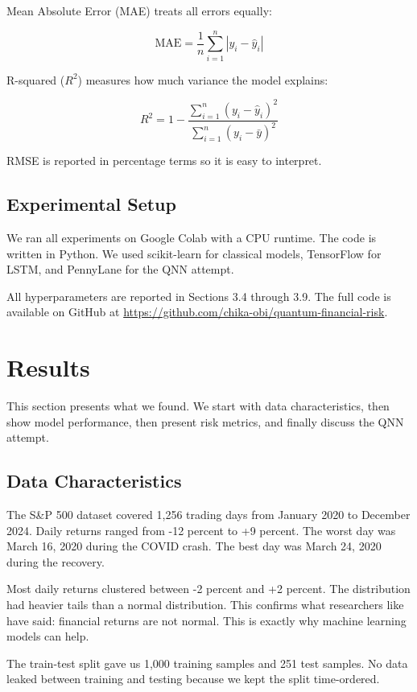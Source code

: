 \documentclass[12pt,a4paper]{article}
\begin{document}
Mean Absolute Error (MAE) treats all errors equally:

\begin{equation}
\text{MAE} = \frac{1}{n} \sum_{i=1}^{n} |y_i - \hat{y}_i|
\end{equation}

R-squared ($R^2$) measures how much variance the model explains:

\begin{equation}
R^2 = 1 - \frac{\sum_{i=1}^{n} (y_i - \hat{y}_i)^2}{\sum_{i=1}^{n} (y_i - \bar{y})^2}
\end{equation}

RMSE is reported in percentage terms so it is easy to interpret.

\subsection{Experimental Setup}
We ran all experiments on Google Colab with a CPU runtime. The code is written in Python. We used scikit-learn for classical models, TensorFlow for LSTM, and PennyLane for the QNN attempt.

All hyperparameters are reported in Sections 3.4 through 3.9. The full code is available on GitHub at \url{https://github.com/chika-obi/quantum-financial-risk}.

\section{Results}
This section presents what we found. We start with data characteristics, then show model performance, then present risk metrics, and finally discuss the QNN attempt.

\subsection{Data Characteristics}
The S\&P 500 dataset covered 1,256 trading days from January 2020 to December 2024. Daily returns ranged from -12 percent to +9 percent. The worst day was March 16, 2020 during the COVID crash. The best day was March 24, 2020 during the recovery.

Most daily returns clustered between -2 percent and +2 percent. The distribution had heavier tails than a normal distribution. This confirms what researchers like \citet{orus2023} have said: financial returns are not normal. This is exactly why machine learning models can help.

The train-test split gave us 1,000 training samples and 251 test samples. No data leaked between training and testing because we kept the split time-ordered.
\end{document}
